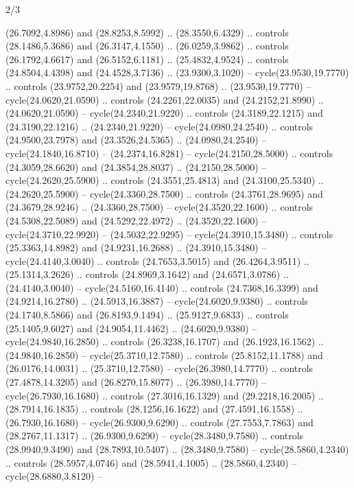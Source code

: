 \begin{flagdescription}{2/3}
\begin{scope}[yshift=\flagwidth,scale=\flagwidth/1241.93737]
\begin{scope}[y=-1mm, x=1mm,draw=gold,fill=blue,line join=miter,miter limit=4,line width=1.8\lw]
\begin{scope}[y=1mm, x=1mm, yscale=-1,shift={(573.68mm+\str,145.75)}]
\begin{scope}[scale=1.35,shift={(-9,-3)}]
\begin{scope}[scale=0.55]
\begin{scope}[scale=1.333]
    (26.7092,4.8986) and (28.8253,8.5992) .. (28.3550,6.4329) .. controls
    (28.1486,5.3686) and (26.3147,4.1550) .. (26.0259,3.9862) .. controls
    (26.1792,4.6617) and (26.5152,6.1181) .. (25.4832,4.9524) .. controls
    (24.8504,4.4398) and (24.4528,3.7136) .. (23.9300,3.1020) --
    cycle(23.9530,19.7770) .. controls (23.9752,20.2254) and (23.9579,19.8768) ..
    (23.9530,19.7770) -- cycle(24.0620,21.0590) .. controls (24.2261,22.0035) and
    (24.2152,21.8990) .. (24.0620,21.0590) -- cycle(24.2340,21.9220) .. controls
    (24.3189,22.1215) and (24.3190,22.1216) .. (24.2340,21.9220) --
    cycle(24.0980,24.2540) .. controls (24.9500,23.7978) and (23.3526,24.5365) ..
    (24.0980,24.2540) -- cycle(24.1840,16.8710) -- (24.2374,16.8281) --
    cycle(24.2150,28.5000) .. controls (24.3059,28.6620) and (24.3854,28.8037) ..
    (24.2150,28.5000) -- cycle(24.2620,25.5900) .. controls (24.3551,25.4813) and
    (24.3100,25.5340) .. (24.2620,25.5900) -- cycle(24.3360,28.7500) .. controls
    (24.3761,28.9695) and (24.3679,28.9246) .. (24.3360,28.7500) --
    cycle(24.3520,22.1600) .. controls (24.5308,22.5089) and (24.5292,22.4972) ..
    (24.3520,22.1600) -- cycle(24.3710,22.9920) -- (24.5032,22.9295) --
    cycle(24.3910,15.3480) .. controls (25.3363,14.8982) and (24.9231,16.2688) ..
    (24.3910,15.3480) -- cycle(24.4140,3.0040) .. controls (24.7653,3.5015) and
    (26.4264,3.9511) .. (25.1314,3.2626) .. controls (24.8969,3.1642) and
    (24.6571,3.0786) .. (24.4140,3.0040) -- cycle(24.5160,16.4140) .. controls
    (24.7368,16.3399) and (24.9214,16.2780) .. (24.5913,16.3887) --
    cycle(24.6020,9.9380) .. controls (24.1740,8.5866) and (26.8193,9.1494) ..
    (25.9127,9.6833) .. controls (25.1405,9.6027) and (24.9054,11.4462) ..
    (24.6020,9.9380) -- cycle(24.9840,16.2850) .. controls (26.3238,16.1707) and
    (26.1923,16.1562) .. (24.9840,16.2850) -- cycle(25.3710,12.7580) .. controls
    (25.8152,11.1788) and (26.0176,14.0031) .. (25.3710,12.7580) --
    cycle(26.3980,14.7770) .. controls (27.4878,14.3205) and (26.8270,15.8077) ..
    (26.3980,14.7770) -- cycle(26.7930,16.1680) .. controls (27.3016,16.1329) and
    (29.2218,16.2005) .. (28.7914,16.1835) .. controls (28.1256,16.1622) and
    (27.4591,16.1558) .. (26.7930,16.1680) -- cycle(26.9300,9.6290) .. controls
    (27.7553,7.7863) and (28.2767,11.1317) .. (26.9300,9.6290) --
    cycle(28.3480,9.7580) .. controls (28.9940,9.3490) and (28.7893,10.5407) ..
    (28.3480,9.7580) -- cycle(28.5860,4.2340) .. controls (28.5957,4.0746) and
    (28.5941,4.1005) .. (28.5860,4.2340) -- cycle(28.6880,3.8120) --

\end{scope}
\end{scope}
\end{scope}
\end{scope}
\end{scope}
\end{scope}
\end{flagdescription}
